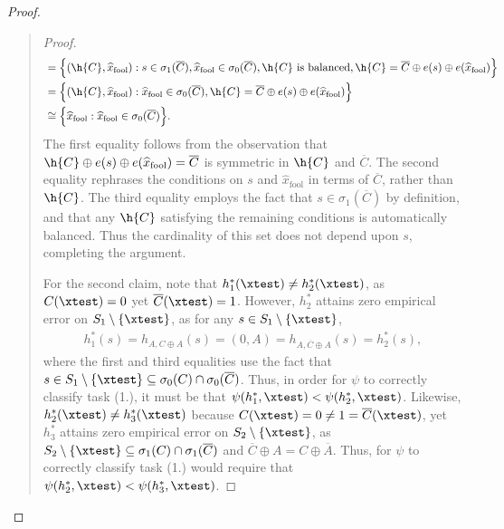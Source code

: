 \begin{proof}
\begin{quote}
\begin{proof}
\begin{align*}
&= \Big\{ (\h{C}, \widehat{x}_{\mathrm{fool}}) : s \in \sigma_1(\overline{C}), \widehat{x}_{\mathrm{fool}} \in \sigma_0(\overline{C}), \h{C} \text{ is balanced}, \h{C} = \overline{C} \oplus e(s) \oplus e(\widehat{x}_{\mathrm{fool}}) \Big\}  \\
&= \Big\{ (\h{C}, \widehat{x}_{\mathrm{fool}}) : \widehat{x}_{\mathrm{fool}} \in \sigma_0(\overline{C}), \h{C}  = \overline{C} \oplus e(s) \oplus e(\widehat{x}_{\mathrm{fool}}) \Big\} \\
&\cong \Big\{ \widehat{x}_{\mathrm{fool}} : \widehat{x}_{\mathrm{fool}} \in \sigma_0(\overline{C}) \Big\}.
\end{align*}
The first equality follows from the observation that $\h{C} \oplus e(s) \oplus e(\widehat{x}_{\mathrm{fool}}) = \overline{C}$ is symmetric in $\h{C}$ and $\overline{C}$. The second equality rephrases the conditions on $s$ and $\widehat{x}_{\mathrm{fool}}$ in terms of $\overline{C}$, rather than $\h{C}$. The third equality employs the fact that $s \in \sigma_1(\overline{C})$ by definition, and that any $\h{C}$ satisfying the remaining conditions is automatically balanced. Thus the cardinality of this set does not depend upon $s$, completing the argument. 

For the second claim, note that $h_1^*(\xtest) \neq h_2^*(\xtest)$, as $C(\xtest) = 0$ yet $\overline{C}(\xtest) = 1$. However, $h_2^*$ attains zero empirical error on $S_1 \setminus \{\xtest\}$, as for any $s \in S_1  \setminus \{\xtest\}$,
\begin{align*}
h_1^*(s) = h_{A, C \oplus A}(s) = (0, A) = h_{A, \overline{C} \oplus A}(s) = h_2^*(s),
\end{align*}
where the first and third equalities use the fact that $s \in S_1 \setminus \{\xtest\} \subseteq \sigma_0(C) \cap \sigma_0(\overline{C})$. Thus, in order for $\psi$ to correctly classify task (1.), it must be that $\psi(h^*_1, \xtest) < \psi(h^*_2, \xtest)$. Likewise, $h_2^*(\xtest) \neq h_3^*(\xtest)$ because $C(\xtest) = 0 \neq 1 =  \overline{C}(\xtest)$, yet $h_3^*$ attains zero empirical error on $S_2 \setminus \{\xtest\}$, as $S_2 \setminus \{\xtest\} \subseteq \sigma_1(C) \cap \sigma_1(\overline{C})$ and $\overline{C} \oplus A = C \oplus \overline{A}$. Thus, for $\psi$ to correctly classify task (1.) would require that $\psi(h^*_2, \xtest) < \psi(h^*_3, \xtest)$. 


\end{proof}
\end{quote}
\end{proof}
